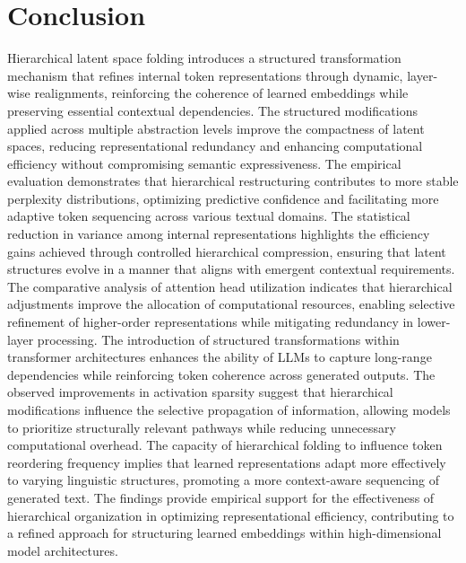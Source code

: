 \documentclass[5p,times]{elsarticle}
\begin{document}
\section{Conclusion}

Hierarchical latent space folding introduces a structured transformation mechanism that refines internal token representations through dynamic, layer-wise realignments, reinforcing the coherence of learned embeddings while preserving essential contextual dependencies. The structured modifications applied across multiple abstraction levels improve the compactness of latent spaces, reducing representational redundancy and enhancing computational efficiency without compromising semantic expressiveness. The empirical evaluation demonstrates that hierarchical restructuring contributes to more stable perplexity distributions, optimizing predictive confidence and facilitating more adaptive token sequencing across various textual domains. The statistical reduction in variance among internal representations highlights the efficiency gains achieved through controlled hierarchical compression, ensuring that latent structures evolve in a manner that aligns with emergent contextual requirements. The comparative analysis of attention head utilization indicates that hierarchical adjustments improve the allocation of computational resources, enabling selective refinement of higher-order representations while mitigating redundancy in lower-layer processing. The introduction of structured transformations within transformer architectures enhances the ability of LLMs to capture long-range dependencies while reinforcing token coherence across generated outputs. The observed improvements in activation sparsity suggest that hierarchical modifications influence the selective propagation of information, allowing models to prioritize structurally relevant pathways while reducing unnecessary computational overhead. The capacity of hierarchical folding to influence token reordering frequency implies that learned representations adapt more effectively to varying linguistic structures, promoting a more context-aware sequencing of generated text. The findings provide empirical support for the effectiveness of hierarchical organization in optimizing representational efficiency, contributing to a refined approach for structuring learned embeddings within high-dimensional model architectures.





\end{document}

